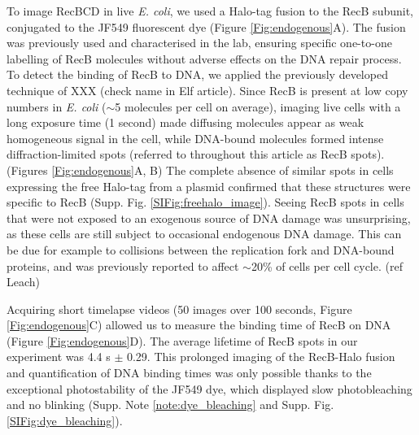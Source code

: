 To image Rec\-BCD in live \textit{E. coli}, we used a Halo-tag fusion to the RecB subunit, conjugated to the JF549 fluorescent dye (Figure \ref{Fig:endogenous}A). The fusion was previously used and characterised in the lab, ensuring specific one-to-one labelling of RecB molecules without adverse effects on the DNA repair process.\cite{Lepore2019} To detect the binding of RecB to DNA, we applied the previously developed technique of XXX (check name in Elf article).\cite{Elf2007}  Since RecB is present at low copy numbers in \textit{E. coli} ($\sim$5 molecules per cell on average\cite{Lepore2019}), imaging live cells with a long exposure time (1 second) made diffusing molecules appear as weak homogeneous signal in the cell, while DNA-bound molecules formed intense diffraction-limited spots (referred to throughout this article as RecB spots). (Figures \ref{Fig:endogenous}A, B) The complete absence of similar spots in cells expressing the free Halo-tag from a plasmid confirmed that these structures were specific to RecB (Supp. Fig. \ref{SIFig:freehalo_image}). Seeing RecB spots in cells that were not exposed to an exogenous source of DNA damage was unsurprising, as these cells are still subject to occasional endogenous DNA damage. This can be due for example to collisions between the replication fork and DNA-bound proteins, and was previously reported to affect $\sim$20\% of cells per cell cycle. (ref Leach)

Acquiring short timelapse videos (50 images over 100 seconds, Figure \ref{Fig:endogenous}C) allowed us to measure the binding time of RecB on DNA (Figure \ref{Fig:endogenous}D). The average lifetime of RecB spots in our experiment was 4.4 s $\pm$ 0.29. This prolonged imaging of the RecB-Halo fusion and quantification of DNA binding times was only possible thanks to the exceptional photostability of the JF549 dye, which displayed slow photobleaching and no blinking (Supp. Note \ref{note:dye_bleaching} and Supp. Fig. \ref{SIFig:dye_bleaching}). 


